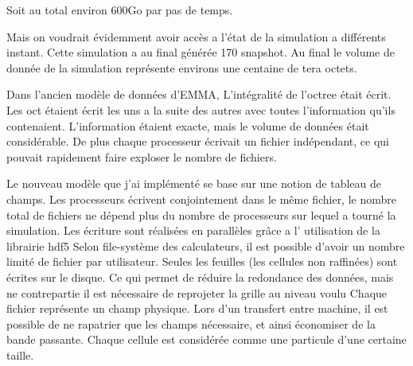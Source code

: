 Soit au total environ 600Go par pas de temps.

Mais on voudrait évidemment avoir accès a l'état de la simulation a différents instant.
Cette simulation a au final générée 170 snapshot.
Au final le volume de donnée de la simulation représente environs une centaine de tera octets.



Dans l'ancien modèle de données d'EMMA,  
L'intégralité de l'octree était écrit.
Les oct étaient écrit les uns a la suite des autres avec toutes l'information qu'ils contenaient.
L'information étaient exacte, mais le volume de données était considérable.
De plus chaque processeur écrivait un fichier indépendant, ce qui pouvait rapidement faire exploser le nombre de fichiers.




Le nouveau modèle que j'ai implémenté se base sur une notion de tableau de champs.
Les processeurs écrivent conjointement dans le même fichier, le nombre total de fichiers ne dépend plus du nombre de processeurs sur lequel a tourné la simulation.
Les écriture sont réalisées en parallèles grâce a l' utilisation de la librairie hdf5
Selon file-système des calculateurs, il est possible d'avoir un nombre limité de fichier par utilisateur.
Seules les feuilles (les cellules non raffinées) sont écrites sur le disque.
Ce qui permet de réduire la redondance des données, mais ne contrepartie il est nécessaire de reprojeter la grille au niveau voulu 
Chaque fichier représente un champ physique.
Lors d'un transfert entre machine, il est possible de ne rapatrier que les champs nécessaire, et ainsi économiser de la bande passante.
Chaque cellule est considérée comme une particule d'une certaine taille.



%





